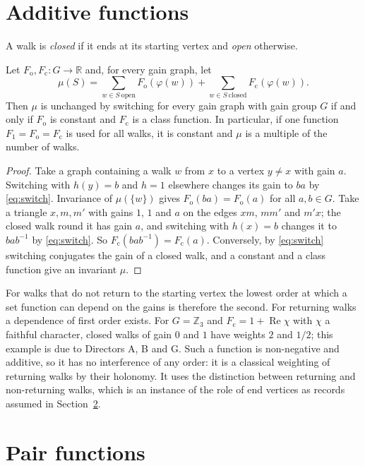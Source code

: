 \section{Additive functions}

A walk is \emph{closed} if it ends at its starting vertex and \emph{open} otherwise.

\begin{lemma}\label{lem:first}
Let $F_{\mathrm o},F_{\mathrm c}\colon G\to\mathbb{R}$ and, for every gain graph, let
\[
\mu(S)=\sum_{w\in S\ \mathrm{open}}F_{\mathrm o}(\varphi(w))+\sum_{w\in S\ \mathrm{closed}}F_{\mathrm c}(\varphi(w)).
\]
Then $\mu$ is unchanged by switching for every gain graph with gain group $G$ if and only if $F_{\mathrm o}$ is constant and $F_{\mathrm c}$ is a class function. In particular, if one function $F_1=F_{\mathrm o}=F_{\mathrm c}$ is used for all walks, it is constant and $\mu$ is a multiple of the number of walks.
\end{lemma}
\begin{proof}
Take a graph containing a walk $w$ from $x$ to a vertex $y\ne x$ with gain $a$. Switching with $h(y)=b$ and $h=1$ elsewhere changes its gain to $ba$ by \eqref{eq:switch}. Invariance of $\mu(\{w\})$ gives $F_{\mathrm o}(ba)=F_{\mathrm o}(a)$ for all $a,b\in G$. Take a triangle $x,m,m'$ with gains $1$, $1$ and $a$ on the edges $xm$, $mm'$ and $m'x$; the closed walk round it has gain $a$, and switching with $h(x)=b$ changes it to $bab^{-1}$ by \eqref{eq:switch}. So $F_{\mathrm c}(bab^{-1})=F_{\mathrm c}(a)$. Conversely, by \eqref{eq:switch} switching conjugates the gain of a closed walk, and a constant and a class function give an invariant $\mu$.
\end{proof}

For walks that do not return to the starting vertex the lowest order at which a set function can depend on the gains is therefore the second. For returning walks a dependence of first order exists. For $G=\mathbb{Z}_3$ and $F_{\mathrm c}=1+\operatorname{Re}\chi$ with $\chi$ a faithful character, closed walks of gain $0$ and $1$ have weights $2$ and $1/2$; this example is due to Directors A, B and G. Such a function is non-negative and additive, so it has no interference of any order: it is a classical weighting of returning walks by their holonomy. It uses the distinction between returning and non-returning walks, which is an instance of the role of end vertices as records assumed in Section~\ref{sec:pair}.

\section{Pair functions}\label{sec:pair}

